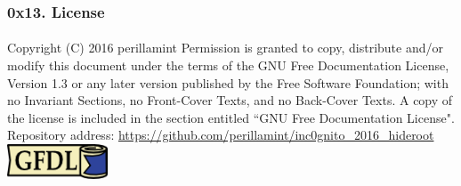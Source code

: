 \begin{frame}
  \frametitle{0x13. License}
  \framesubtitle{}
  Copyright (C)  2016 perillamint\linebreak
  Permission is granted to copy, distribute and/or modify this document
  under the terms of the GNU Free Documentation License, Version 1.3
  or any later version published by the Free Software Foundation;\linebreak
  with no Invariant Sections, no Front-Cover Texts, and no Back-Cover Texts.
  A copy of the license is included in the section entitled ``GNU
  Free Documentation License".
  \linebreak
  \linebreak
  Repository address:\linebreak
  \url{https://github.com/perillamint/inc0gnito_2016_hideroot}
  \linebreak
  \linebreak
  \includegraphics [width=30mm]{img/gfdl-logo-small.png}
\end{frame}


